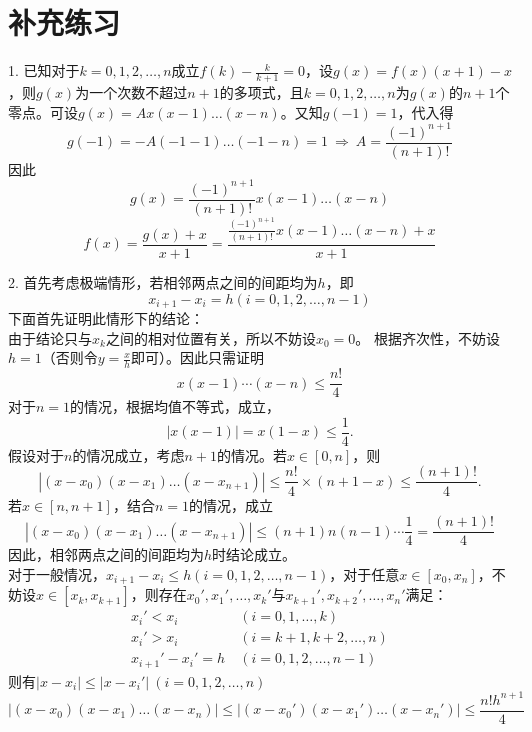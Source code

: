 \documentclass[12pt, a4paper]{article}
\theoremstyle{margin}
\begin{document}
\section{补充练习}

1. 已知对于$k=0,1,2,\dots,n$成立$f\left(k\right)-\frac{k}{k+1}=0$，设$g\left(x\right)=f\left(x\right)\left(x+1\right)-x$，则$g\left(x\right)$为一个次数不超过$n+1$的多项式，且$k=0,1,2,\dots,n$为$g\left(x\right)$的$n+1$个零点。可设$g\left(x\right)=Ax\left(x-1\right)\dots\left(x-n\right)$。又知$g\left(-1\right)=1$，代入得
\[g\left(-1\right)=-A\left(-1-1\right)\dots\left(-1-n\right)=1\ \Rightarrow\ A=\frac{\left(-1\right)^{n+1}}{\left(n+1\right)!}\]
因此
\[g\left(x\right)=\frac{\left(-1\right)^{n+1}}{\left(n+1\right)!}x\left(x-1\right)\dots\left(x-n\right)\]
\[f\left(x\right)=\frac{g\left(x\right)+x}{x+1}=\frac{\frac{\left(-1\right)^{n+1}}{\left(n+1\right)!}x\left(x-1\right)\dots\left(x-n\right)+x}{x+1}\]
\newline

2. 首先考虑极端情形，若相邻两点之间的间距均为$h$，即
$$x_{i+1}-x_i=h\left(i=0,1,2,\dots,n-1\right)$$
下面首先证明此情形下的结论：\\
由于结论只与$x_k$之间的相对位置有关，所以不妨设$x_0 = 0$。
根据齐次性，不妨设$h = 1$（否则令$y = \frac{x}{h}$即可）。因此只需证明
\[
  x(x-1)\cdots(x-n) \le \frac{n!}{4}
\]
对于$n=1$的情况，根据均值不等式，成立，
\[
  |x(x-1)| = x(1-x) \le \frac{1}{4}.
\]
假设对于$n$的情况成立，考虑$n+1$的情况。若$x\in[0, n]$，则
\[
  |\left(x-x_0\right)\left(x-x_1\right)\dots\left(x-x_{n+1}\right)| \le \frac{n!}{4}\times(n+1-x) \le \frac{(n+1)!}{4}.
\]
若$x\in[n, n+1]$，结合$n=1$的情况，成立
\[
  |\left(x-x_0\right)\left(x-x_1\right)\dots\left(x-x_{n+1}\right)| \le (n+1)n(n-1)\cdots\frac{1}{4} = \frac{(n+1)!}{4}
\]
因此，相邻两点之间的间距均为$h$时结论成立。\\
对于一般情况，$x_{i+1}-x_i\leq h\left(i=0,1,2,\dots,n-1\right)$，对于任意$x\in \left[x_0,x_n\right]$，不妨设$x\in\left[x_{k},x_{k+1}\right]$，则存在$x_0',x_1',\dots,x_{k}'$与$x_{k+1}',x_{k+2}',\dots,x_{n}'$满足：
\[\begin{split}
x_i'<x_i\ &\left(i=0,1,\dots,k\right) \\
x_i'>x_i\ &\left(i=k+1,k+2,\dots,n\right) \\
x_{i+1}'-x_i'=h\ &\left(i=0,1,2,\dots,n-1\right)
\end{split}\]
则有$|x-x_i|\leq|x-x_i'|\ \left(i=0,1,2,\dots,n\right)$
\[|\left(x-x_0\right)\left(x-x_1\right)\dots\left(x-x_n\right)|\leq|\left(x-x_0'\right)\left(x-x_1'\right)\dots\left(x-x_n'\right)|\leq \frac{n!h^{n+1}}{4}
\]
\end{document}
